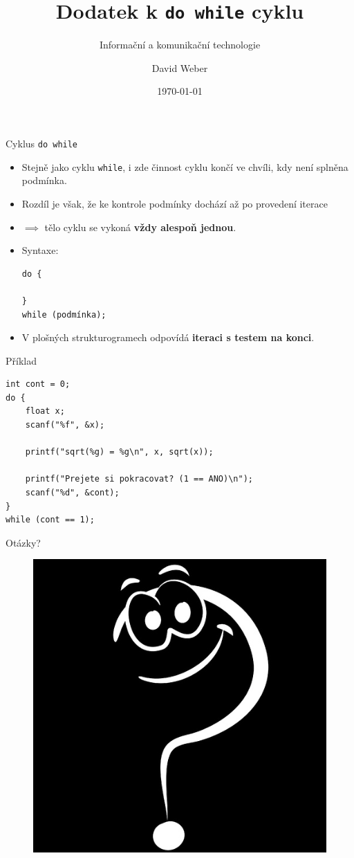 \documentclass[14pt,aspectratio=169]{beamer}
\title{Dodatek k \texttt{do while} cyklu}
\subtitle{Informační a komunikační technologie}
\author{David Weber}
\date{\today}
\begin{document}

    \begin{frame}
        \titlepage
    \end{frame}

    \begin{frame}[t,fragile]{Cyklus \texttt{do while}}
        \begin{itemize}
            \item Stejně jako cyklu \texttt{while}, i zde činnost cyklu končí ve chvíli, kdy není splněna podmínka.
            \item Rozdíl je však, že ke kontrole podmínky dochází až po provedení iterace
            \item $\implies$ tělo cyklu se vykoná \textbf{vždy alespoň jednou}.
            \item Syntaxe:
            \begin{lstlisting}
do {

}
while (podmínka);
            \end{lstlisting}
            \item V plošných strukturogramech odpovídá \textbf{iteraci s testem na konci}.
        \end{itemize}
    \end{frame}

    \begin{frame}[t,fragile]{Příklad}
        \begin{lstlisting}
int cont = 0;
do {
    float x;
    scanf("%f", &x);

    printf("sqrt(%g) = %g\n", x, sqrt(x));

    printf("Prejete si pokracovat? (1 == ANO)\n");
    scanf("%d", &cont);
}
while (cont == 1);
        \end{lstlisting}
    \end{frame}

    \begin{frame}{Otázky?}
        \begin{figure}
            \centering
            \includegraphics[scale=.4]{images/discussion_inverted.png}
        \end{figure}
    \end{frame}
\end{document}
